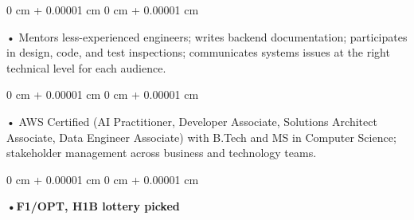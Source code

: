 \documentclass[10pt, letterpaper]{article}
\newenvironment{onecolentry}{
    \begin{adjustwidth}{
        0 cm + 0.00001 cm
    }{
        0 cm + 0.00001 cm
    }
}{
    \end{adjustwidth}
} %
\begin{document}
        \begin{onecolentry}
            • Mentors less-experienced engineers; writes backend documentation; participates in design, code, and test inspections; communicates systems issues at the right technical level for each audience.
        \end{onecolentry}
        \begin{onecolentry}
            • AWS Certified (AI Practitioner, Developer Associate, Solutions Architect Associate, Data Engineer Associate) with B.Tech and MS in Computer Science; stakeholder management across business and technology teams.
        \end{onecolentry}
        \begin{onecolentry}
                \textbf{•F1/OPT, H1B lottery picked}
        \end{onecolentry}

    \vspace{2 pt }
\end{document}
